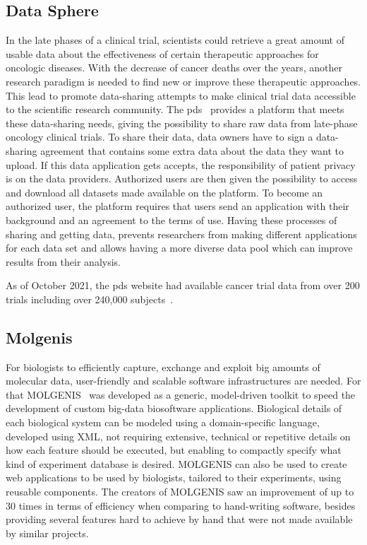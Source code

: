 \subsection*{Data Sphere}
In the late phases of a clinical trial, scientists could retrieve a great amount of usable data about the effectiveness of certain therapeutic approaches for oncologic diseases.
With the decrease of cancer deaths over the years, another research paradigm is needed to find new or improve these therapeutic approaches.
This lead to promote data-sharing attempts to make clinical trial data accessible to the scientific research community.
The \gls{pds}~\cite{datasphere} provides a platform that meets these data-sharing needs, giving the possibility to share raw data from late-phase oncology clinical trials.
To share their data, data owners have to sign a data-sharing agreement that contains some extra data about the data they want to upload.
If this data application gets accepts, the responsibility of patient privacy is on the data providers.
Authorized users are then given the possibility to access and download all datasets made available on the platform.
To become an authorized user, the platform requires that users send an application with their background and an agreement to the terms of use.
Having these processes of sharing and getting data, prevents researchers from making different applications for each data set and allows having a more diverse data pool which can improve results from their analysis.

As of October 2021, the \gls{pds} website had available cancer trial data from over 200 trials including over 240,000 subjects~\cite{datasphere-site}.

\subsection*{Molgenis}
For biologists to efficiently capture, exchange and exploit big amounts of molecular data, user-friendly and scalable software infrastructures are needed.
For that MOLGENIS~\cite{molgenis} was developed as a generic, model-driven toolkit to speed the development of custom big-data biosoftware applications.
Biological details of each biological system can be modeled using a domain-specific language, developed using XML, not requiring extensive, technical or repetitive details on how each feature should be executed, but enabling to compactly specify what kind of experiment database is desired.
MOLGENIS can also be used to create web applications to be used by biologists, tailored to their experiments, using reusable components.
The creators of MOLGENIS saw an improvement of up to 30 times in terms of efficiency when comparing to hand-writing software, besides providing several features hard to achieve by hand that were not made available by similar projects.

